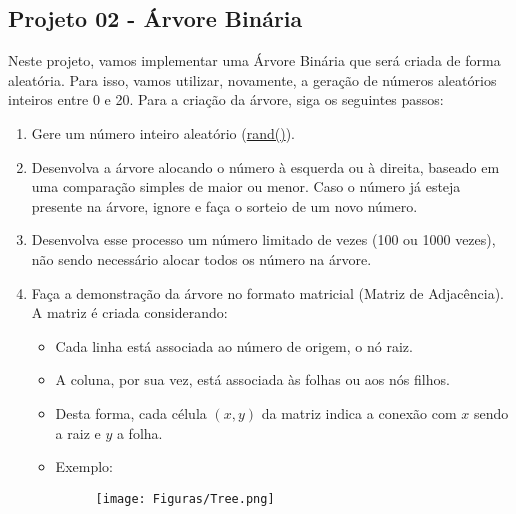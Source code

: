 \documentclass[a4paper]{exam}
\begin{document}
\newpage
\begin{center}
	\section*{Projeto 02 - Árvore Binária}
\end{center}

Neste projeto, vamos implementar uma Árvore Binária que será criada de forma aleatória. Para isso, vamos utilizar, novamente, a geração de números aleatórios inteiros entre 0 e 20. Para a criação da árvore, siga os seguintes passos:

\begin{enumerate}
	\item Gere um número inteiro aleatório (\href{https://www.cplusplus.com/reference/cstdlib/rand/}{rand()}).
	\item Desenvolva a árvore alocando o número à esquerda ou à direita, baseado em uma comparação simples de maior ou menor. Caso o número já esteja presente na árvore, ignore e faça o sorteio de um novo número.
	\item Desenvolva esse processo um número limitado de vezes (100 ou 1000 vezes), não sendo necessário alocar todos os número na árvore.
	\item Faça a demonstração da árvore no formato matricial (Matriz de Adjacência). A matriz é criada considerando:
	\begin{itemize}
		\item Cada linha está associada ao número de origem, o nó raiz.
		\item A coluna, por sua vez, está associada às folhas ou aos nós filhos.
		\item Desta forma, cada célula $(x,y)$ da matriz indica a conexão com $x$ sendo a raiz e $y$ a folha.
		\item Exemplo:
		\begin{figure} [H]
			\centering
			\texttt{[image: Figuras/Tree.png]}
		\end{figure}
	

\end{itemize}
\end{enumerate}
\end{document}
